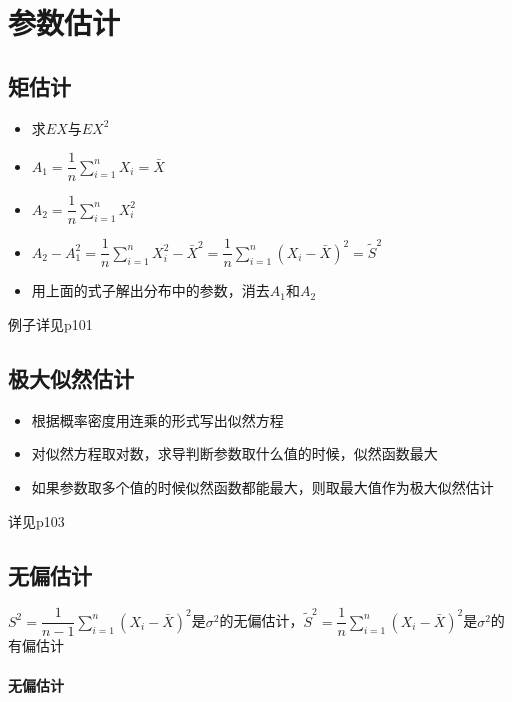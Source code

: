 
\section{参数估计}

\subsection{矩估计}

\begin{itemize}
\item 求$EX$与$EX^{2}$
\item $A_{1} = \dfrac{1}{n} \sum\limits_{i=1}^{n} X_{i} = \bar{X}$
\item $A_{2} = \dfrac{1}{n} \sum\limits_{i=1}^{n} X_{i}^{2}$
\item $A_{2} - A_{1}^{2} = \dfrac{1}{n} \sum\limits_{i=1}^{n} X_{i}^{2} - \bar{X}^{2} = \dfrac{1}{n} \sum\limits_{i=1}^{n} \left( X_{i}-\bar{X} \right)^{2} = \tilde{S}^{2}$
\item 用上面的式子解出分布中的参数，消去$A_{1}$和$A_{2}$
\end{itemize}
例子详见p101

\subsection{极大似然估计}

\begin{itemize}
\item 根据概率密度用连乘的形式写出似然方程
\item 对似然方程取对数，求导判断参数取什么值的时候，似然函数最大
\item 如果参数取多个值的时候似然函数都能最大，则取最大值作为极大似然估计
  
\end{itemize}
详见p103

\subsection{无偏估计}

$S^{2}=\dfrac{1}{n-1} \sum\limits_{i=1}^{n} \left( X_{i} - \bar{X} \right)^{2}$是$\sigma^{2}$的无偏估计，$\tilde{S}^{2}=\dfrac{1}{n} \sum\limits_{i=1}^{n} \left( X_{i} - \bar{X} \right)^{2}$是$\sigma^{2}$的有偏估计

\paragraph{无偏估计}

